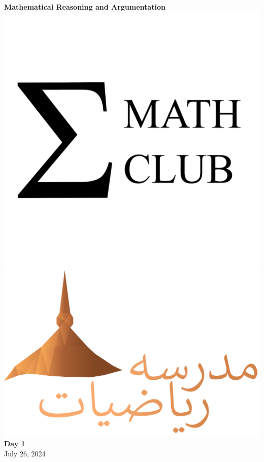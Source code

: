 \documentclass{article}
\theoremstyle{mytheoremstyle}
\theoremstyle{mytheoremstyle}
\theoremstyle{myexamplestyle}
\begin{document}
\begin{titlepage}
    \begin{center}
        {\Huge \textbf{Mathematical Reasoning and Argumentation}}\\
        \vfill
        \includegraphics[scale=0.2]{../assests/math-club-logo-black-transparent.png}\\
        \vfill
        \includegraphics[scale=0.25]{../assests/madarsa-logo.png}\\
        \vfill
        {\Large \textbf{Day 1}}\\
        {\Large {July 26, 2024}}
    \end{center}
\end{titlepage}
\end{document}
